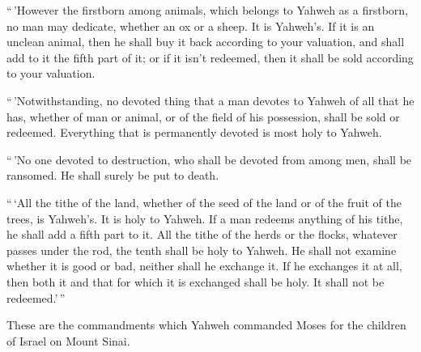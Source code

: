  ``\,'However the firstborn among animals, which belongs
to Yahweh as a firstborn, no man may dedicate, whether an ox or a sheep.
It is Yahweh's.  If it is an unclean animal, then he
shall buy it back according to your valuation, and shall add to it the
fifth part of it; or if it isn't redeemed, then it shall be sold
according to your valuation.

 ``\,'Notwithstanding, no devoted thing that a man
devotes to Yahweh of all that he has, whether of man or animal, or of
the field of his possession, shall be sold or redeemed. Everything that
is permanently devoted is most holy to Yahweh.

 ``\,'No one devoted to destruction, who shall be devoted
from among men, shall be ransomed. He shall surely be put to death.

 ``\,`All the tithe of the land, whether of the seed of
the land or of the fruit of the trees, is Yahweh's. It is holy to
Yahweh.  If a man redeems anything of his tithe, he shall
add a fifth part to it.  All the tithe of the herds or
the flocks, whatever passes under the rod, the tenth shall be holy to
Yahweh.  He shall not examine whether it is good or bad,
neither shall he exchange it. If he exchanges it at all, then both it
and that for which it is exchanged shall be holy. It shall not be
redeemed.'\,''

 These are the commandments which Yahweh commanded Moses
for the children of Israel on Mount Sinai.
